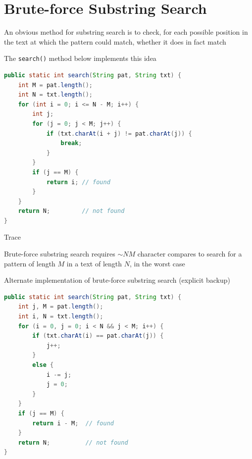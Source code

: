 \documentclass[8pt,a4paper,compress]{beamer}
\begin{document}
\section{Brute-force Substring Search}
\begin{frame}[fragile]
\pause

An obvious method for substring search is to check, for each possible position in the text at which the pattern could match, whether it does in fact match

\pause
\bigskip

The \lstinline{search()} method below implements this idea
\begin{lstlisting}[language=Java]
public static int search(String pat, String txt) {
    int M = pat.length();
    int N = txt.length();
    for (int i = 0; i <= N - M; i++) {
        int j;
        for (j = 0; j < M; j++) {
            if (txt.charAt(i + j) != pat.charAt(j)) {
                break;
            }
        }
        if (j == M) { 
            return i; // found
        } 
    }
    return N;         // not found
}
\end{lstlisting}
\end{frame}

\begin{frame}[fragile]
\pause

Trace
\begin{center}
\end{center}

\pause
\bigskip

Brute-force substring search requires $\sim NM$ character compares to search for a pattern of length $M$ in a text of length $N$, in the worst case
\end{frame}

\begin{frame}[fragile]
\pause

Alternate implementation of brute-force substring search (explicit backup)

\begin{lstlisting}[language=Java]
public static int search(String pat, String txt) {
    int j, M = pat.length();
    int i, N = txt.length();
    for (i = 0, j = 0; i < N && j < M; i++) {
        if (txt.charAt(i) == pat.charAt(j)) { 
            j++; 
        }
        else { 
            i -= j; 
            j = 0; 
        }
    }
    if (j == M) { 
        return i - M;  // found
    }
    return N;          // not found 
}
\end{lstlisting}
\end{frame}
\end{document}

